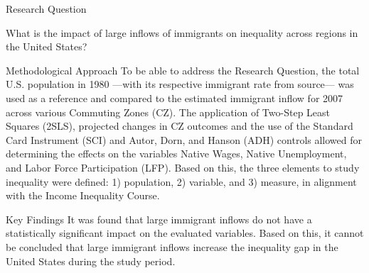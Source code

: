 \begin{frame}

    \begin{block}{Research Question}
    \end{block}
    What is the impact of large inflows of immigrants on inequality across regions in the United States?
    \begin{block}{Methodological Approach} 
    To be able to address the Research Question, the total U.S. population in 1980 —with its respective immigrant rate from source— was used as a reference and compared to the estimated immigrant inflow for 2007 across various Commuting Zones (CZ).
    The application of Two-Step Least Squares (2SLS), projected changes in CZ outcomes and the use of the Standard Card Instrument (SCI) and Autor, Dorn, and Hanson (ADH) controls allowed for determining the effects on the variables Native Wages, Native Unemployment, and Labor Force Participation (LFP).
    Based on this, the three elements to study inequality were defined: 1) population, 2) variable, and 3) measure, in alignment with the Income Inequality Course.        
    \end{block}
    \begin{block}{Key Findings} 
    It was found that large immigrant inflows do not have a statistically significant impact on the evaluated variables. Based on this, it cannot be concluded that large immigrant inflows increase the inequality gap in the United States during the study period.
    \end{block}
    
\end{frame}
